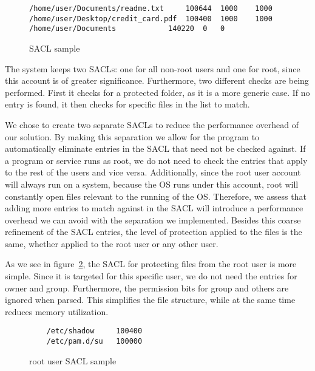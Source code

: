 \begin{figure}[ht]
	\centering
	\begin{lstlisting}
/home/user/Documents/readme.txt		100644	1000	1000
/home/user/Desktop/credit_card.pdf	100400	1000	1000
/home/user/Documents			140220	0	0
	\end{lstlisting}
	\caption{\ac{SACL} sample}
	\label{fig:sacl}
\end{figure}

\par The system keeps two \acp{SACL}: one for all non-root users and one for root, since this account is of greater significance. Furthermore, two different checks are being performed. First it checks for a protected folder, as it is a more generic case. If no entry is found, it then checks for specific files in the list to match. 

\par We chose to create two separate \acp{SACL} to reduce the performance overhead of our solution. By making this separation we allow for the program to automatically eliminate entries in the \ac{SACL} that need not be checked against. If a program or service runs as root, we do not need to check the entries that apply to the rest of the users and vice versa. Additionally, since the root user account will always run on a system, because the \ac{OS} runs under this account, root will constantly open files relevant to the running of the \ac{OS}. Therefore, we assess that adding more entries to match against in the \ac{SACL} will introduce a performance overhead we can avoid with the separation we implemented. Besides this coarse refinement of the \ac{SACL} entries, the level of protection applied to the files is the same, whether applied to the root user or any other user.

\par As we see in figure~\ref{fig:root_sacl}, the \ac{SACL} for protecting files from the root user is more simple. Since it is targeted for this specific user, we do not need the entries for owner and group. Furthermore, the permission bits for group and others are ignored when parsed. This simplifies the file structure, while at the same time reduces memory utilization.

\begin{figure}[ht]
	\centering
	\begin{lstlisting}
	/etc/shadow     100400
	/etc/pam.d/su   100000
	\end{lstlisting}
	\caption{root user \ac{SACL} sample}
	\label{fig:root_sacl}
\end{figure}


